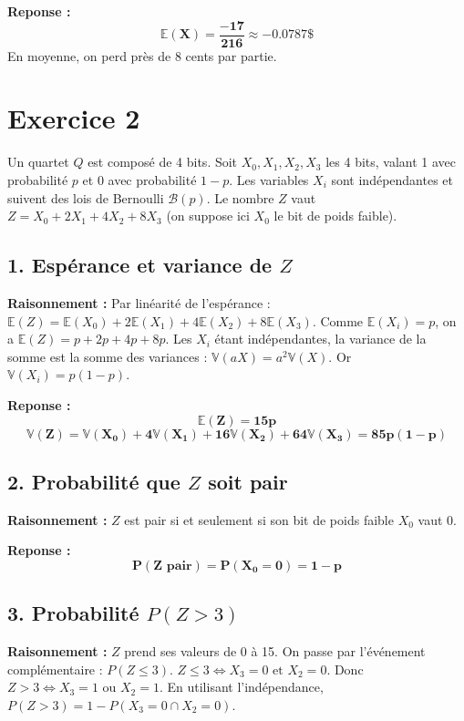 \documentclass[11pt,a4paper]{article}
\begin{document}
\textbf{Reponse :}
$$
\mathbf{\mathbb{E}(X) = \frac{-17}{216} \approx -0.0787\$}
$$
En moyenne, on perd près de 8 cents par partie.

\hrulefill

\section*{Exercice 2}

Un quartet $Q$ est composé de 4 bits. Soit $X_0, X_1, X_2, X_3$ les 4 bits, valant 1 avec probabilité $p$ et 0 avec probabilité $1-p$.
Les variables $X_i$ sont indépendantes et suivent des lois de Bernoulli $\mathcal{B}(p)$.
Le nombre $Z$ vaut $Z = X_0 + 2X_1 + 4X_2 + 8X_3$ (on suppose ici $X_0$ le bit de poids faible).

\subsection*{1. Espérance et variance de $Z$}

\textbf{Raisonnement :} Par linéarité de l'espérance : $\mathbb{E}(Z) = \mathbb{E}(X_0) + 2\mathbb{E}(X_1) + 4\mathbb{E}(X_2) + 8\mathbb{E}(X_3)$. Comme $\mathbb{E}(X_i) = p$, on a $\mathbb{E}(Z) = p + 2p + 4p + 8p$.
Les $X_i$ étant indépendantes, la variance de la somme est la somme des variances : $\mathbb{V}(aX) = a^2\mathbb{V}(X)$. Or $\mathbb{V}(X_i) = p(1-p)$.

\textbf{Reponse :}
$$
\mathbf{\mathbb{E}(Z) = 15p}
$$
$$
\mathbf{\mathbb{V}(Z) = \mathbb{V}(X_0) + 4\mathbb{V}(X_1) + 16\mathbb{V}(X_2) + 64\mathbb{V}(X_3) = 85p(1-p)}
$$

\subsection*{2. Probabilité que $Z$ soit pair}

\textbf{Raisonnement :} $Z$ est pair si et seulement si son bit de poids faible $X_0$ vaut 0.

\textbf{Reponse :}
$$
\mathbf{P(Z \text{ pair}) = P(X_0 = 0) = 1-p}
$$

\subsection*{3. Probabilité $P(Z>3)$}

\textbf{Raisonnement :} $Z$ prend ses valeurs de 0 à 15. On passe par l'événement complémentaire : $P(Z \le 3)$.
$Z \le 3 \iff X_3 = 0 \text{ et } X_2 = 0$. Donc $Z > 3 \iff X_3 = 1 \text{ ou } X_2 = 1$.
En utilisant l'indépendance, $P(Z>3) = 1 - P(X_3=0 \cap X_2=0)$.
\end{document}
